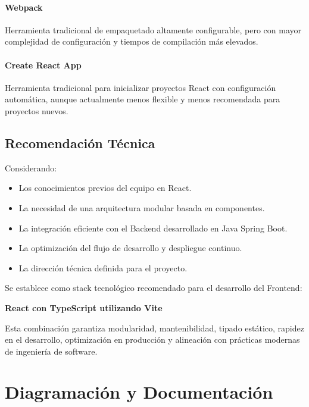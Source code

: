 \documentclass[12pt]{article}
\begin{document}
\paragraph{Webpack}

Herramienta tradicional de empaquetado altamente configurable, pero con mayor complejidad de configuración y tiempos de compilación más elevados.

\paragraph{Create React App}

Herramienta tradicional para inicializar proyectos React con configuración automática, aunque actualmente menos flexible y menos recomendada para proyectos nuevos.

\subsection{Recomendación Técnica}

Considerando:

\begin{itemize}
    \item Los conocimientos previos del equipo en React.
    \item La necesidad de una arquitectura modular basada en componentes.
    \item La integración eficiente con el Backend desarrollado en Java Spring Boot.
    \item La optimización del flujo de desarrollo y despliegue continuo.
    \item La dirección técnica definida para el proyecto.
\end{itemize}

Se establece como stack tecnológico recomendado para el desarrollo del Frontend:

\begin{center}
\textbf{\Large React con TypeScript utilizando Vite}
\end{center}

Esta combinación garantiza modularidad, mantenibilidad, tipado estático, rapidez en el desarrollo, optimización en producción y alineación con prácticas modernas de ingeniería de software.


\section{Diagramación y Documentación}
\end{document}
